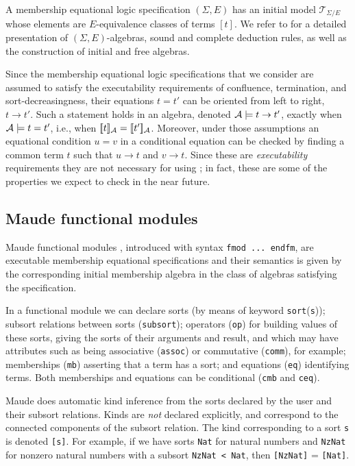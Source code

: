 A membership equational logic specification $(\Sigma,E)$ has an initial model 
$\mathcal{T}_{\Sigma/E}$ whose elements
are $E$-equivalence classes of terms $[t]$.
We refer to \cite{BouhoulaJouannaudMeseguer00,Meseguer97} for a detailed presentation of
$(\Sigma,E)$-algebras,
sound and complete deduction rules, as well as the construction of
initial and free algebras.

Since the membership equational logic specifications that we consider are assumed
to satisfy the executability requirements of confluence, termination, and 
sort-decreasingness, their equations $t=t'$ can be oriented from left to right,
$t \rightarrow t'$. Such a statement holds in an algebra, denoted 
$\mathcal{A} \models t \rightarrow t'$, exactly when $\mathcal{A} \models t = t'$, i.e., when
$[\![t]\!]_{\mathcal{A}} = [\![t']\!]_{\mathcal{A}}$. Moreover, under those assumptions an equational condition $u = v$
in a conditional equation can be checked by finding a common term $t$ such
that $u \rightarrow t$ and $v \rightarrow t$. Since these are \emph{executability}
requirements they are not necessary for using \Hets; in fact, these are some of
the properties we expect to check in the near future.

\subsection{Maude functional modules} \label{maudefmod}

Maude functional modules \cite[Chapter 4]{maude-book}, introduced 
with syntax \texttt{fmod ...\ endfm}, are executable membership
equational specifications and their semantics is given by the corresponding
initial membership algebra in the class of algebras satisfying the specification.

In a functional module we can declare sorts (by means of keyword
\texttt{sort}(\texttt{s})); subsort relations between sorts
(\texttt{subsort}); operators (\texttt{op}) for building values of these
sorts, giving the sorts of their arguments and result, and which may have
attributes such as being associative (\texttt{assoc}) or commutative
(\texttt{comm}), for example; memberships (\texttt{mb}) asserting that a term
has a sort; and equations (\texttt{eq}) identifying terms.  
Both memberships and equations can be conditional (\texttt{cmb} and \texttt{ceq}).

Maude does automatic kind inference from the sorts declared by the user and
their subsort relations.  Kinds are \emph{not} declared explicitly, and
correspond to the connected components of the subsort relation.
The kind corresponding to a sort \texttt{s} is denoted \texttt{[s]}.
For example, if we have sorts \texttt{Nat} for natural numbers and \texttt{NzNat} 
for nonzero natural numbers with a subsort \texttt{NzNat < Nat}, then 
\texttt{[NzNat]} = \texttt{[Nat]}.

